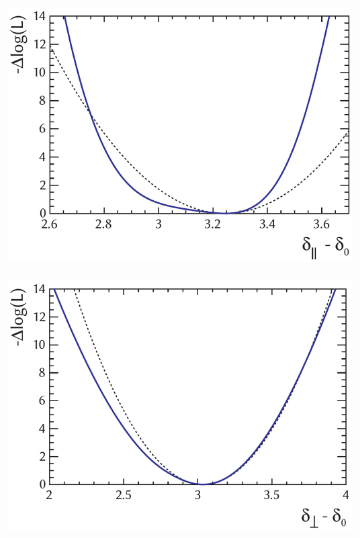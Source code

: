 \begin{figure}[tbp]
  \centering
  \begin{subfigure}{0.49\textwidth}
    \includegraphics[width=\textwidth]{graphics/results/NLL_polarDep_AparPhase}
    \caption{}
  \end{subfigure}
  \hfill%
  \begin{subfigure}{0.49\textwidth}
    \includegraphics[width=\textwidth]{graphics/results/NLL_polarDep_AperpPhase}
    \caption{}
  \end{subfigure}


\end{figure}
